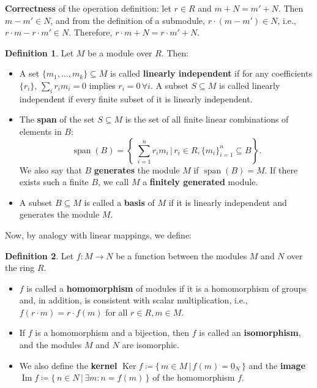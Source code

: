 \documentclass{article}
\newif\ifusemulticols
\newcommand\newterm[1]{\textbf{#1}}
\theoremstyle{definition}
\newtheorem{deff}{Definition}
\theoremstyle{remark}
\theoremstyle{plain}
\theoremstyle{plain}
\newenvironment{mymulticols}
    { \ifusemulticols \begin{multicols}{2} \fi }
    { \ifusemulticols \end{multicols} \fi }
\DeclareMathOperator{\vecspan}{span}
\DeclareMathOperator{\Ker}{Ker}
\DeclareMathOperator{\image}{Im}
\begin{document}
\begin{mymulticols}
\textbf{Correctness} of the operation definition: let $r \in R$ and $m + N = m' + N$.
Then $m - m' \in N$, and from the definition of a submodule, $r \cdot (m - m') \in N$, i.e., $r \cdot m - r \cdot m' \in N$. Therefore, $r\cdot m + N = r\cdot m' + N$.

\begin{deff}
    Let $M$ be a module over $R$. Then:
    \begin{itemize}
        \item A set $\{m_1, \dots, m_k\} \subseteq M$ is called \newterm{linearly independent} if for any coefficients $\{r_i\}$, $\sum_i r_i m_i = 0$ implies $r_i = 0 \, \forall i$. A subset $S \subseteq M$ is called linearly independent if every finite subset of it is linearly independent.

        \item The \newterm{span} of the set $S \subseteq M$ is the set of all finite linear combinations of elements in $B$: 
            $$\vecspan(B)=\left\{\; \sum_{i=1}^n r_i m_i \,\Big|\, r_i \in R, \{m_i\}_{i=1}^n \subseteq B \right\}.$$
            We also say that $B$ \newterm{generates} the module $M$ if $\vecspan(B) = M$. 
            If there exists such a finite $B$, we call $M$ a \newterm{finitely generated} module.

        \item A subset $B \subseteq M$ is called a \newterm{basis} of $M$ if it is linearly independent and generates the module $M$.
    \end{itemize}
\end{deff}

Now, by analogy with linear mappings, we define:

\begin{deff}
    Let $f: M \to N$ be a function between the modules $M$ and $N$ over the ring $R$.
    \begin{itemize}
        \item $f$ is called a \newterm{homomorphism} of modules if it is a homomorphism of groups
            and, in addition, is consistent with scalar multiplication, i.e., $f(r \cdot m) = r \cdot
            f(m)$ for all $r \in R, m \in M$.

        \item If $f$ is a homomorphism and a bijection, then $f$ is called an \newterm{isomorphism},
            and the modules $M$ and $N$ are isomorphic.

        \item We also define the \newterm{kernel} $\Ker f \coloneqq \{\, m \in M \,|\, f(m) = 0_N \,
            \}$ and the \newterm{image} $\image f \coloneqq \{\, n \in N \,|\, \exists m: n = f(m) \,
            \}$ of the homomorphism $f$.
    \end{itemize}
\end{deff}


\end{mymulticols}
\end{document}
